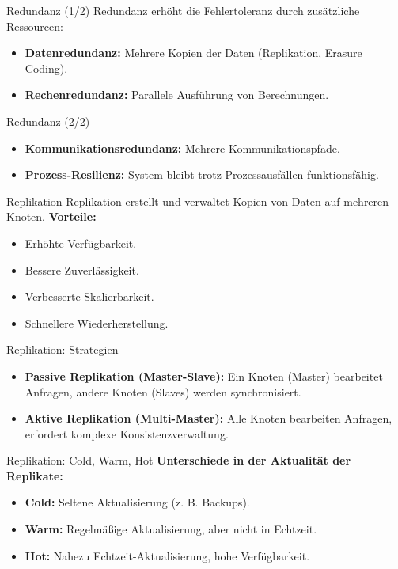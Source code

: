 \documentclass{beamer}
\begin{document}
\begin{frame}{Redundanz (1/2)}
    Redundanz erhöht die Fehlertoleranz durch zusätzliche Ressourcen:
    \begin{itemize}
        \item \textbf{Datenredundanz:} Mehrere Kopien der Daten (Replikation, Erasure Coding).
        \item \textbf{Rechenredundanz:} Parallele Ausführung von Berechnungen.
    \end{itemize}
\end{frame}

\begin{frame}{Redundanz (2/2)}
    \begin{itemize}
        \item \textbf{Kommunikationsredundanz:} Mehrere Kommunikationspfade.
        \item \textbf{Prozess-Resilienz:} System bleibt trotz Prozessausfällen funktionsfähig.
    \end{itemize}
\end{frame}

\begin{frame}{Replikation}
    Replikation erstellt und verwaltet Kopien von Daten auf mehreren Knoten. \newline
    \textbf{Vorteile:}
    \begin{itemize}
        \item Erhöhte Verfügbarkeit.
        \item Bessere Zuverlässigkeit.
        \item Verbesserte Skalierbarkeit.
        \item Schnellere Wiederherstellung.
    \end{itemize}
\end{frame}

\begin{frame}{Replikation: Strategien}
    \begin{itemize}
        \item \textbf{Passive Replikation (Master-Slave):} Ein Knoten (Master) bearbeitet Anfragen, andere Knoten (Slaves) werden synchronisiert.
        \item \textbf{Aktive Replikation (Multi-Master):} Alle Knoten bearbeiten Anfragen, erfordert komplexe Konsistenzverwaltung.
    \end{itemize}
\end{frame}

\begin{frame}{Replikation: Cold, Warm, Hot}
    \textbf{Unterschiede in der Aktualität der Replikate:}
    \begin{itemize}
        \item \textbf{Cold:} Seltene Aktualisierung (z. B. Backups).
        \item \textbf{Warm:} Regelmäßige Aktualisierung, aber nicht in Echtzeit.
        \item \textbf{Hot:} Nahezu Echtzeit-Aktualisierung, hohe Verfügbarkeit.
    \end{itemize}
\end{frame}
\end{document}
